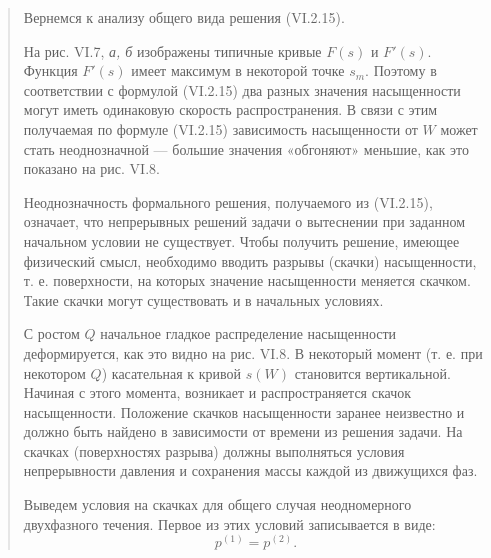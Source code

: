 \documentclass[12pt,a4paper]{article}
\begin{document}
\begin{quote}\sloppy
Вернемся к анализу общего вида решения (VI.2.15).

На рис. VI.7, \textit{а, б} изображены типичные кривые $F(s)$ и $F'(s)$. Функция $F'(s)$ имеет максимум в некоторой точке $s_m$. Поэтому в соответствии с формулой (VI.2.15) два разных значения насыщенности могут иметь одинаковую скорость распространения. В связи с этим получаемая по формуле (VI.2.15) зависимость насыщенности от $W$
может стать неоднозначной --- большие значения «обгоняют» меньшие, как это показано на рис. VI.8.

Неоднозначность формального решения, получаемого из (VI.2.15), означает, что непрерывных решений задачи о вытеснении при заданном начальном условии не существует. Чтобы получить решение, имеющее физический смысл, необходимо вводить разрывы (скачки) насыщенности, т. е. поверхности, на которых значение насыщенности меняется скачком. Такие скачки могут существовать и в начальных условиях.

С ростом $Q$ начальное гладкое распределение насыщенности деформируется, как это видно на рис. VI.8. В некоторый момент (т. е. при некотором $Q$) касательная к кривой $s(W)$ становится вертикальной. Начиная с этого момента, возникает и распространяется скачок насыщенности. Положение скачков насыщенности заранее неизвестно и должно быть найдено в зависимости от времени из решения задачи. На скачках (поверхностях разрыва) должны выполняться условия непрерывности давления и сохранения массы каждой из движущихся фаз.

Выведем условия на скачках для общего случая неодномерного двухфазного течения. Первое из этих условий записывается в виде:
\begin{equation}p^{(1)}=p^{(2)}.\tag{VI.2.19}\label{q11:eq-VI-2-19}\end{equation}
\par\nobreak{}\par
\end{quote}
\end{document}
